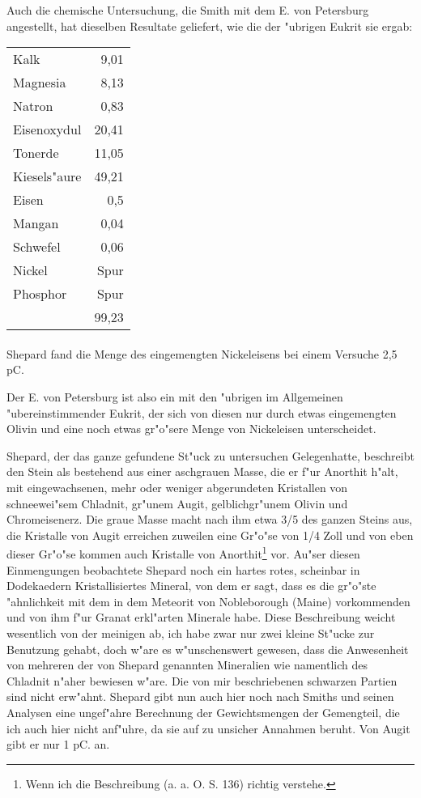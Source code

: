 \documentclass[a4paper, 11pt, oneside]{article}
\begin{document}
Auch die chemische Untersuchung, die Smith mit dem E. von Petersburg angestellt, hat dieselben Resultate geliefert, wie die der "ubrigen Eukrit sie ergab:
\begin{center}
\begin{tabular}{ l r }
    Kalk & 9,01\\
    Magnesia & 8,13\\
    Natron & 0,83\\
    Eisenoxydul & 20,41\\
    Tonerde & 11,05\\
    Kiesels"aure & 49,21\\
    Eisen & 0,5\\
    Mangan & 0,04\\
    Schwefel & 0,06\\
    Nickel & Spur\\
    Phosphor & Spur\\
     & 99,23\\
\end{tabular}
\end{center}
\paragraph{}
Shepard fand die Menge des eingemengten Nickeleisens bei einem Versuche 2,5 pC.

Der E. von Petersburg ist also ein mit den "ubrigen im Allgemeinen "ubereinstimmender Eukrit, der sich von diesen nur durch etwas eingemengten Olivin und eine noch etwas gr"o"sere Menge von Nickeleisen unterscheidet.

Shepard, der das ganze gefundene St"uck zu untersuchen Gelegenhatte, beschreibt den Stein als bestehend aus einer aschgrauen Masse, die er f"ur Anorthit h"alt, mit eingewachsenen, mehr oder weniger abgerundeten Kristallen von schneewei"sem Chladnit, gr"unem Augit, gelblichgr"unem Olivin und Chromeisenerz. Die graue Masse macht nach ihm etwa 3/5 des ganzen Steins aus, die Kristalle von Augit erreichen zuweilen eine Gr"o"se von 1/4 Zoll und von eben dieser Gr"o"se kommen auch Kristalle von Anorthit\footnote{Wenn ich die Beschreibung (a. a. O. S. 136) richtig verstehe.} vor. Au"ser diesen Einmengungen beobachtete Shepard noch ein hartes rotes, scheinbar in Dodekaedern Kristallisiertes Mineral, von dem er sagt, dass es die gr"o"ste "ahnlichkeit mit dem in dem Meteorit von Nobleborough (Maine) vorkommenden und von ihm f"ur Granat erkl"arten Minerale habe. Diese Beschreibung weicht wesentlich von der meinigen ab, ich habe zwar nur zwei kleine St"ucke zur Benutzung gehabt, doch w"are es w"unschenswert gewesen, dass die Anwesenheit von mehreren der von Shepard genannten Mineralien wie namentlich des Chladnit n"aher bewiesen w"are. Die von mir beschriebenen schwarzen Partien sind nicht erw"ahnt. Shepard gibt nun auch hier noch nach Smiths und seinen Analysen eine ungef"ahre Berechnung der Gewichtsmengen der Gemengteil, die ich auch hier nicht anf"uhre, da sie auf zu unsicher Annahmen beruht. Von Augit gibt er nur 1 pC. an.
\end{document}
